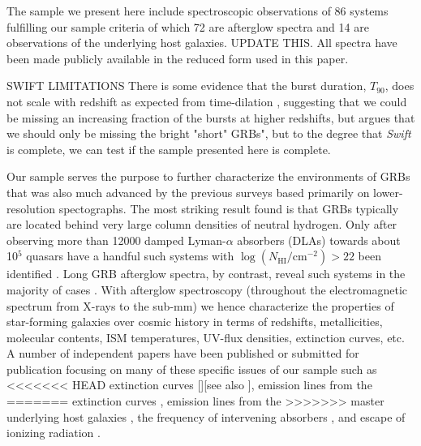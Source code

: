 \documentclass{aa}    %
\begin{document}
The sample we present here include spectroscopic observations of 86 
systems fulfilling our sample criteria of which 72 are afterglow spectra 
and 14 are observations of the underlying host galaxies. 
UPDATE THIS.
All spectra have been made publicly available in the reduced form used
in this paper.

SWIFT LIMITATIONS
There is some evidence that the burst duration, $T_{90}$, does not scale with
redshift as expected from time-dilation \citep{Kocevski2013, Littlejohns2013a},
suggesting that we could be missing an increasing fraction of the bursts at
higher redshifts, but \citet{Lien2016} argues that we should only be missing the
bright "short" GRBs", but to the degree that \textit{Swift} is complete, we can
test if the sample presented here is complete.




Our sample serves the purpose to further characterize the environments of GRBs
that was also much advanced by the previous surveys based primarily on
lower-resolution spectographs. The most striking result found is that GRBs
typically are located behind very large column densities of neutral hydrogen.
Only after observing more than 12000 damped Lyman-$\alpha$ absorbers (DLAs)
towards about 10$^5$ quasars have a handful such systems with
$\log({N_\mathrm{HI}/\mathrm{cm^{-2}}}) > 22$ been identified \citep[e.g., five
in][]{Noterdaeme2012b}. Long GRB afterglow spectra, by contrast, reveal such
systems in the majority of cases \citep[][and this work]{Jakobsson2006b,
	Fynbo2009, Cucchiara2015}.  With afterglow spectroscopy (throughout the electromagnetic
spectrum from X-rays to the sub-mm) we hence characterize the properties of
star-forming galaxies over cosmic history in terms of redshifts, metallicities,
molecular contents, ISM temperatures, UV-flux densities, extinction curves,
etc.  A number of independent papers have been published or submitted for
publication focusing on many of these specific issues of our sample such as
<<<<<<< HEAD
extinction curves [][see also
\cite{Fynbo2014, Heintz2017}]\citep{Japelj2015, Zafar2017}, emission lines from the
=======
extinction curves \citep[][see also
\cite{Fynbo2014,Heintz2017}]{Japelj2015,Zafar17}, emission lines from the
>>>>>>> master
underlying host galaxies \citep{Kruhler2015}, the frequency of intervening
 absorbers \citep{Christensen2017}, and escape of ionizing
radiation \citep{Tanvir2017}.
\end{document}
